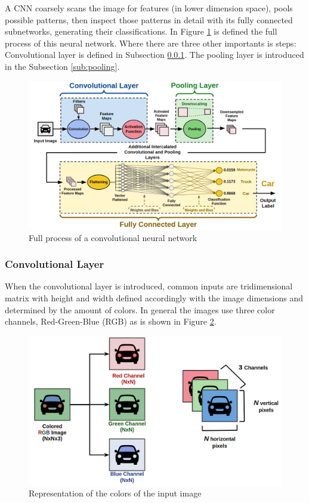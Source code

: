 A CNN coarsely scans the image for features (in lower dimension space), pools possible patterns, then inspect those patterns in detail with its fully connected
subnetworks, generating their classifications. In Figure \ref{fig:cnn_car} is defined the full process of this neural network. Where there are three other importants is steps: Convolutional layer is defined in Subsection \ref{sub:conv}. The pooling layer is introduced in the Subsection \ref{sub:pooling}.
\begin{figure}[H]
\centering
\includegraphics[width=\columnwidth]{imagens/Full_Process.png}
\caption{Full process of a convolutional neural network}
\label{fig:cnn_car}
\end{figure}


\subsubsection{Convolutional Layer}
\label{sub:conv}

When the convolutional layer is introduced, common inputs are tridimensional matrix with height and width defined accordingly with the image dimensions and determined by the amount of colors. In general the images use three color channels, Red-Green-Blue (RGB) as is shown in Figure \ref{fig:rgb}.

\begin{figure}[H]
\centering
\includegraphics[scale=0.35]{imagens/rgb_representation.png}
\caption{Representation of the colors of the input image}
\label{fig:rgb}
\end{figure}


